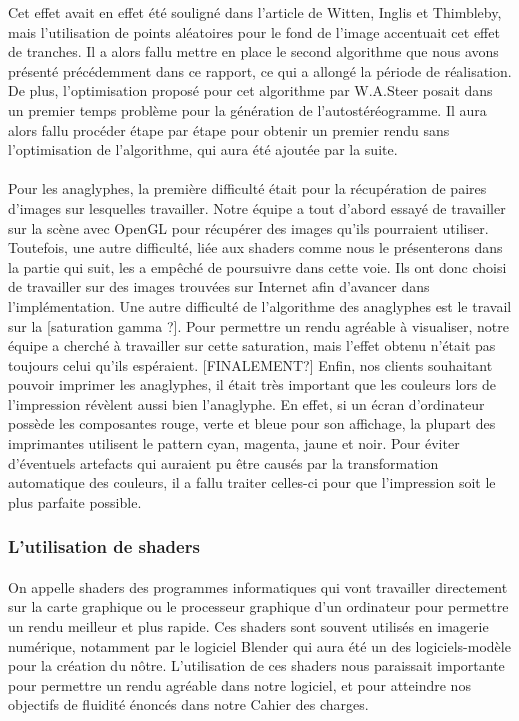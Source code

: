 Cet effet avait en effet été souligné dans l'article de Witten, Inglis et Thimbleby, mais l'utilisation de points aléatoires pour le fond de l'image accentuait cet effet de tranches. 
Il a alors fallu mettre en place le second algorithme que nous avons présenté précédemment dans ce rapport, ce qui a allongé la période de réalisation. De plus, l'optimisation proposé pour cet algorithme par W.A.Steer posait dans un premier temps problème pour la génération de l'autostéréogramme. Il aura alors fallu procéder étape par étape pour obtenir un premier rendu sans l'optimisation de l'algorithme, qui aura été ajoutée par la suite.

\paragraph{}
Pour les anaglyphes, la première difficulté était pour la récupération de paires d'images sur lesquelles travailler. Notre équipe a tout d'abord essayé de travailler sur la scène avec OpenGL pour récupérer des images qu'ils pourraient utiliser. Toutefois, une autre difficulté, liée aux shaders comme nous le présenterons dans la partie qui suit, les a empêché de poursuivre dans cette voie. Ils ont donc choisi de travailler sur des images trouvées sur Internet afin d'avancer dans l'implémentation. 
Une autre difficulté de l'algorithme des anaglyphes est le travail sur la [saturation gamma ?]. Pour permettre un rendu agréable à visualiser, notre équipe a cherché à travailler sur cette saturation, mais l'effet obtenu n'était pas toujours celui qu'ils espéraient. [FINALEMENT?]
Enfin, nos clients souhaitant pouvoir imprimer les anaglyphes, il était très important que les couleurs lors de l'impression révèlent aussi bien l'anaglyphe. En effet, si un écran d'ordinateur possède les composantes rouge, verte et bleue pour son affichage, la plupart des imprimantes utilisent le pattern cyan, magenta, jaune et noir. Pour éviter d'éventuels artefacts qui auraient pu être causés par la transformation automatique des couleurs, il a fallu traiter celles-ci pour que l'impression soit le plus parfaite possible.

\subsubsection{L'utilisation de shaders}
\paragraph{}
On appelle shaders des programmes informatiques qui vont travailler directement sur la carte graphique ou le processeur graphique d'un ordinateur pour permettre un rendu meilleur et plus rapide. Ces shaders sont souvent utilisés en imagerie numérique, notamment par le logiciel Blender qui aura été un des logiciels-modèle pour la création du nôtre. L'utilisation de ces shaders nous paraissait importante pour permettre un rendu agréable dans notre logiciel, et pour atteindre nos objectifs de fluidité énoncés dans notre Cahier des charges.


